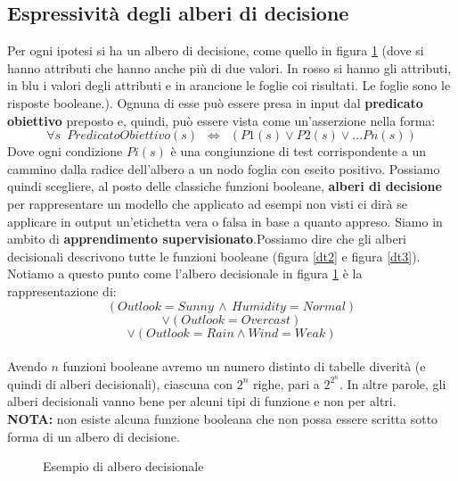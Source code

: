 \subsection{Espressività degli alberi di decisione}
Per ogni ipotesi si ha un albero di decisione, come quello in figura \ref{dt} (dove si hanno attributi che hanno anche più di due valori. In rosso si hanno gli
attributi, in blu i valori degli attributi e in arancione le foglie coi
risultati. Le foglie sono le risposte booleane.). Ognuna di esse può essere presa in input dal \textbf{predicato obiettivo} preposto e, quindi, può essere vista come un'asserzione nella forma:
\[\forall s\,\,\,PredicatoObiettivo(s)\,\,\,\iff\,\,\,(P1(s)\vee P2(s)  \vee ... Pn(s))\]
Dove ogni condizione $Pi(s)$ è una congiunzione di test corrispondente a un cammino dalla radice dell'albero a un nodo foglia con eseito positivo.
Possiamo quindi scegliere, al posto delle classiche funzioni booleane,
\textbf{alberi di decisione} per rappresentare un modello che applicato ad
esempi non visti ci dirà se applicare in output un'etichetta vera o falsa in
base a quanto appreso. Siamo in ambito di \textbf{apprendimento
  supervisionato}.Possiamo dire che gli alberi decisionali descrivono tutte le funzioni booleane (figura \ref{dt2} e figura \ref{dt3}). 
Notiamo a questo punto come l'albero decisionale in figura \ref{dt} è la
rappresentazione di:
\[(Outlook=Sunny\,\land\, Humidity=Normal)\]
\[\lor(Outlook=Overcast)\]
\[\lor(Outlook=Rain \land Wind=Weak) \] \\ Avendo $n$ funzioni booleane avremo un numero distinto di tabelle diverità (e quindi di alberi decisionali), ciascuna con $2^n$ righe, pari a $2^{2^{n}}$. In altre parole, gli alberi decisionali vanno bene per alcuni tipi di funzione e non per altri.\\
  \textbf{NOTA:} non esiste alcuna funzione booleana che non possa essere scritta sotto forma di un albero di decisione.\\
\begin{figure}
  \centering
  \caption{Esempio di albero decisionale}
  \label{dt}
\end{figure}

